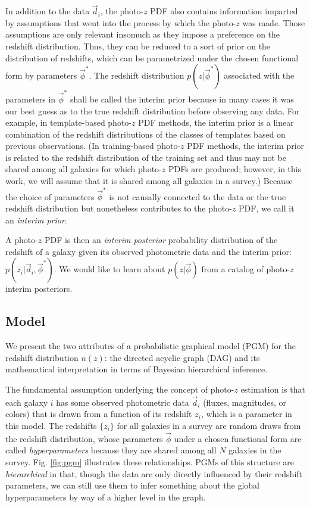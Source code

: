 \documentclass[iop]{emulateapj}
\begin{document}
In addition to the data $\vec{d}_{i}$, the photo-$z$ PDF also contains 
information imparted by assumptions that went into the process by which the 
photo-$z$ was made.  Those assumptions are only relevant insomuch as they 
impose a preference on the redshift distribution. Thus, they can be reduced to 
a sort of prior on the distribution of redshifts, which can be parametrized 
under the chosen functional form by parameters $\vec{\phi}^{*}$.  The redshift 
distribution $p(z | \vec{\phi}^{*})$ associated with the parameters in 
$\vec{\phi}^{*}$ shall be called the interim prior because in many cases it was 
our best guess as to the true redshift distribution before observing any data.  
For example, in template-based photo-$z$ PDF methods, the interim prior is a 
linear combination of the redshift distributions of the classes of templates 
based on previous observations.  (In training-based photo-$z$ PDF methods, the 
interim prior is related to the redshift distribution of the training set and 
thus may not be shared among all galaxies for which photo-$z$ PDFs are 
produced; however, in this work, we will assume that it is shared among all 
galaxies in a survey.)  Because the choice of parameters $\vec{\phi}^{*}$ is 
not causally connected to the data or the true redshift distribution but 
nonetheless contributes to the photo-$z$ PDF, we call it an \textit{interim 
prior}.  

A photo-$z$ PDF is then an \textit{interim posterior} probability distribution 
of the redshift of a galaxy given its observed photometric data and the interim 
prior: $p(z_{i} | \vec{d}_{i}, \vec{\phi}^{*})$.  We would like to learn about 
$p(z | \vec{\phi})$ from a catalog of photo-$z$ interim posteriors.

\subsection{Model}
\label{sec:model}

We present the two attributes of a probabilistic graphical model (PGM) for the 
redshift distribution $n(z)$: the directed acyclic graph (DAG) and its 
mathematical interpretation in terms of Bayesian hierarchical inference.  

The fundamental assumption underlying the concept of photo-$z$ estimation is 
that each galaxy $i$ has some observed photometric data $\vec{d}_{i}$ (fluxes, 
magnitudes, or colors) that is drawn from a function of its redshift $z_{i}$, 
which is a parameter in this model.  The redshifts $\{z_{i}\}$ for all galaxies 
in a survey are random draws from the redshift distribution, whose parameters  
$\vec{\phi}$ under a chosen functional form are called \textit{hyperparameters} 
because they are shared among all $N$ galaxies in the survey.  Fig. 
\ref{fig:pgm} illustrates these relationships.  PGMs of this structure are 
\textit{hierarchical} in that, though the data are only directly influenced by 
their redshift parameters, we can still use them to infer something about the 
global hyperparameters by way of a higher level in the graph.
\end{document}
